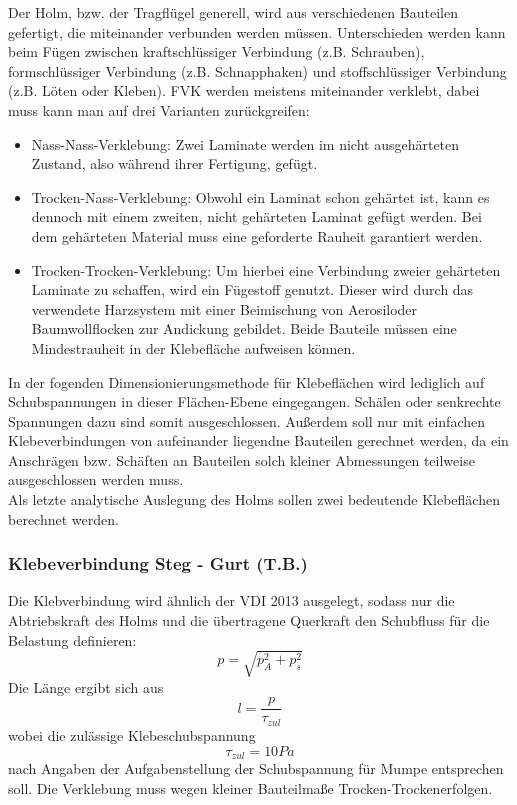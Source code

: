 Der Holm, bzw. der Tragflügel generell, wird aus verschiedenen Bauteilen gefertigt, die miteinander verbunden werden müssen. Unterschieden werden kann beim Fügen zwischen kraftschlüssiger Verbindung (z.B. Schrauben), formschlüssiger Verbindung (z.B. Schnapphaken) und stoffschlüssiger Verbindung (z.B. Löten oder Kleben). FVK werden meistens miteinander verklebt, dabei muss kann man auf drei Varianten zurückgreifen:
\begin{itemize}
	\item Nass-Nass-Verklebung: Zwei Laminate werden im nicht ausgehärteten Zustand, also während ihrer Fertigung, gefügt.
	\item Trocken-Nass-Verklebung: Obwohl ein Laminat schon gehärtet ist, kann es dennoch mit einem zweiten, nicht gehärteten Laminat gefügt werden. Bei dem gehärteten Material muss eine geforderte Rauheit garantiert werden.
	\item Trocken-Trocken-Verklebung: Um hierbei eine Verbindung zweier gehärteten Laminate zu schaffen, wird ein Fügestoff genutzt. Dieser wird durch das verwendete Harzsystem mit einer Beimischung von Aerosiloder Baumwollflocken zur Andickung gebildet. Beide Bauteile müssen eine Mindestrauheit in der Klebefläche aufweisen können.
\end{itemize}

\noindent In der fogenden Dimensionierungsmethode für Klebeflächen wird lediglich auf Schubspannungen in dieser Flächen-Ebene eingegangen. Schälen oder senkrechte Spannungen dazu sind somit ausgeschlossen. Außerdem soll nur mit einfachen Klebeverbindungen von aufeinander liegendne Bauteilen gerechnet werden, da ein Anschrägen bzw. Schäften an Bauteilen solch kleiner Abmessungen teilweise ausgeschlossen werden muss.\\

\noindent Als letzte analytische Auslegung des Holms sollen zwei bedeutende Klebeflächen berechnet werden.
\subsubsection{Klebeverbindung Steg - Gurt (T.B.)}
Die Klebverbindung wird ähnlich der VDI 2013 ausgelegt, sodass nur die Abtriebskraft des Holms und die übertragene Querkraft den Schubfluss für die Belastung definieren:
\begin{equation}
	p=\sqrt{p_{A}^{2}+p_{s}^{2}}
\end{equation}
Die Länge ergibt sich aus 
\begin{equation}
	l=\frac{p}{\tau_{zul}}
\end{equation}
wobei die zulässige Klebeschubspannung
\begin{equation}
	\tau_{zul}=10 Pa
\end{equation}
nach Angaben der Aufgabenstellung der Schubspannung für Mumpe entsprechen soll. Die Verklebung muss wegen kleiner Bauteilmaße \glqq Trocken-Trocken\grqq erfolgen.\\

